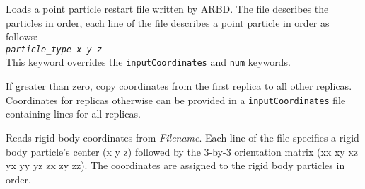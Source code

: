 \documentclass[10pt]{article}
\newcommand{\code}[1]{\texttt{#1}}
\begin{document}

{Loads a point particle restart file written by ARBD.
The file describes the particles in order, each line of the file describes a point particle in order as follows: \\ \noindent
\code{\textit{particle\_type} \textit{x} \textit{y} \textit{z}} \\ \noindent
This keyword overrides the \code{inputCoordinates} and \code{num} keywords.
}

{If greater than zero, copy coordinates from the first replica to all other replicas. 
Coordinates for replicas otherwise can be provided in a \code{inputCoordinates} 
 file containing lines for all replicas.
}

{Reads rigid body coordinates from \textit{Filename}.
Each line of the file specifies a rigid body particle's center (x y z) followed by the 3-by-3 orientation matrix (xx xy xz yx yy yz zx zy zz).
The coordinates are assigned to the rigid body particles in order.
}





\end{document}
